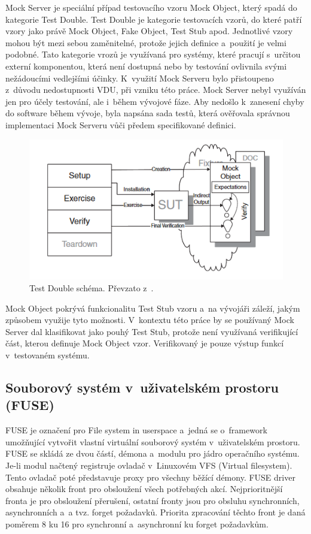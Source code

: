 Mock Server je speciální případ testovacího vzoru Mock Object, který spadá do kategorie Test Double. Test Double je kategorie testovacích vzorů, do které patří
vzory jako právě Mock Object, Fake Object, Test Stub apod. Jednotlivé vzory mohou být mezi sebou zaměnitelné, protože jejich definice a použití je velmi podobné. 
Tato kategorie vrozů je využívaná pro systémy, které pracují s určitou externí komponentou, která není dostupná nebo by testování ovlivnila svými nežádoucími
vedlejšími účinky.\cite[522--524]{UnitPatternsTest} K využití Mock Serveru bylo přistoupeno z důvodu nedostupnosti VDU, při vzniku této práce. Mock Server nebyl využíván 
jen pro účely testování, ale i během vývojové fáze. Aby nedošlo k zanesení chyby do software během vývoje, byla napsána sada testů, která ověřovala správnou
implementaci Mock Serveru vůči předem specifikované definici.

\begin{figure}[h]
    \centering
    \includegraphics[width=0.67\linewidth]{other-fig/mock_object.png}
    \caption{Test Double schéma. Převzato z \cite[544]{UnitPatternsTest}.}
\end{figure}

Mock Object pokrývá funkcionalitu Test Stub vzoru a na vývojáři záleží, jakým způsobem využije tyto možnosti. V kontextu této práce by se používaný Mock Server dal
klasifikovat jako pouhý Test Stub, protože není využívaná verifikující část, kterou definuje Mock Object vzor. \cite[524--525]{UnitPatternsTest} Verifikovaný je pouze
výstup funkcí v testovaném systému.

\subsection{Souborový systém v uživatelském prostoru (FUSE)}
\label{sec:fuse}

FUSE je označení pro File system in userspace a jedná se o framework umožňující vytvořit vlastní virtuální souborový systém v uživatelském prostoru. FUSE se skládá
ze dvou částí, démona a modulu pro jádro operačního systému. Je-li modul načtený registruje ovladač v Linuxovém VFS (Virtual filesystem). Tento ovladač poté
představuje proxy pro všechny běžící démony. FUSE driver obsahuje několik front pro obsloužení všech potřebných akcí. Nejprioritnější fronta je pro obsloužení
přerušení, ostatní fronty jsou pro obsluhu synchronních, asynchronních a a tvz. forget požadavků. Priorita zpracování těchto front je daná poměrem 8 ku 16 pro 
synchronní a asynchronní ku forget požadavkům. \cite{FuseOrNotToFuse}

